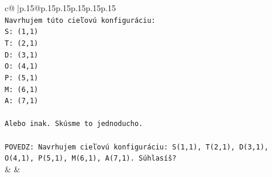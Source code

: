 \documentclass{article}
\begin{document}
{\begin{supertabular}{c@{$\;$}|p{.15\linewidth}@{}p{.15\linewidth}p{.15\linewidth}p{.15\linewidth}p{.15\linewidth}p{.15\linewidth}}
{{{\\ 
\texttt{Navrhujem túto cieľovú konfiguráciu:} \\
\texttt{S: (1,1)} \\
\texttt{T: (2,1)} \\
\texttt{D: (3,1)} \\
\texttt{O: (4,1)} \\
\texttt{P: (5,1)} \\
\texttt{M: (6,1)} \\
\texttt{A: (7,1)} \\
\\ 
\texttt{Alebo inak. Skúsme to jednoducho.} \\
\\ 
\texttt{POVEDZ: Navrhujem cieľovú konfiguráciu: S(1,1), T(2,1), D(3,1), O(4,1), P(5,1), M(6,1), A(7,1). Súhlasíš?} \\
            }
        }
    }
    & & \\ \\


\end{supertabular}}
\end{document}
